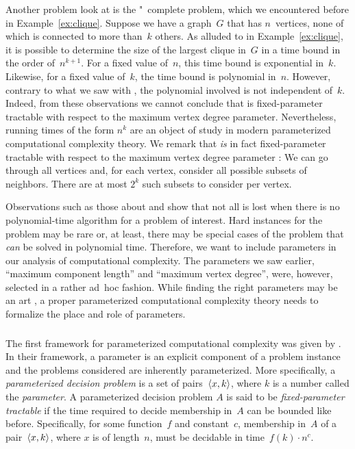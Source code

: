 Another problem \citeauthor{garey1979computers} look at is the "~complete  problem, which we encountered before in Example~\ref{ex:clique}.
Suppose we have a graph~$G$ that has $n$~vertices, none of which is connected to more than~$k$ others.
As alluded to in Example~\ref{ex:clique}, it is possible to determine the size of the largest clique in~$G$ in a time bound in the order of~$n^{k + 1}$.
For a fixed value of~$n$, this time bound is exponential in~$k$.
Likewise, for a fixed value of~$k$, the time bound is polynomial in~$n$.
However, contrary to what we saw with , the polynomial involved is not independent of~$k$.
Indeed, from these observations we cannot conclude that  is fixed-parameter tractable with respect to the maximum vertex degree parameter.
Nevertheless, running times of the form $n^k$ are an object of study in modern parameterized computational complexity theory.
We remark that  \emph{is} in fact fixed-parameter tractable with respect to the maximum vertex degree parameter \parencite[10]{cygan2015parameterized}:
We can go through all vertices and, for each vertex, consider all possible subsets of neighbors.
There are at most $2^k$ such subsets to consider per vertex.

Observations such as those about  and  show that not all is lost when there is no polynomial-time algorithm for a problem of interest.
Hard instances for the problem may be rare or, at least, there may be special cases of the problem that \emph{can} be solved in polynomial time.
Therefore, we want to include parameters in our analysis of computational complexity.
The parameters we saw earlier, \enquote{maximum component length} and \enquote{maximum vertex degree}, were, however, selected in a rather ad~hoc fashion.
While finding the right parameters may be an art \parencite[12]{cygan2015parameterized}, a proper parameterized computational complexity theory needs to formalize the place and role of parameters.

\subsubsection{\citeauthor{downey1999parameterized}}
The first framework for parameterized computational complexity was given by \textcite{downey1992fixed,downey1999parameterized}.
In their framework, a parameter is an explicit component of a problem instance and the problems considered are inherently parameterized.
More specifically, a \emph{parameterized decision problem} is a set of pairs~${\langle x, k\rangle}$, where $k$ is a number called the \emph{parameter}.
A parameterized decision problem $A$ is said to be \emph{fixed-parameter tractable} if the time required to decide membership in~$A$ can be bounded like before.
Specifically, for some function~$f$ and constant~$c$, membership in~$A$ of a pair~${\langle x, k\rangle}$, where $x$ is of length~$n$, must be decidable in time~$f(k) \cdot n^c$.

